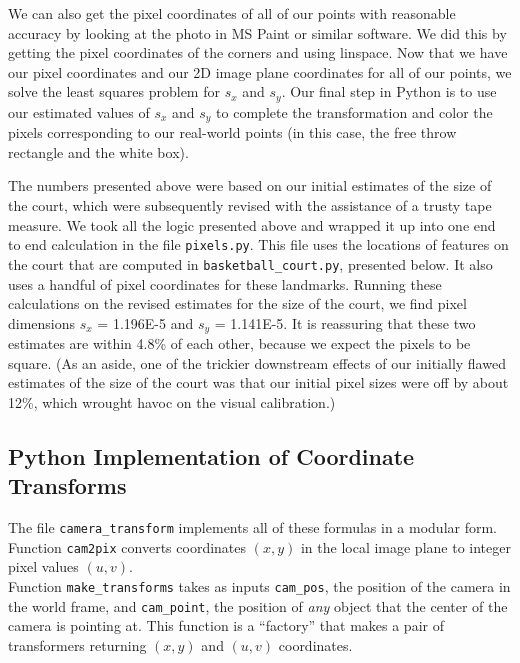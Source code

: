 \documentclass{article}
\begin{document}
We can also get the pixel coordinates of all of our points with reasonable accuracy by looking at the photo in MS Paint or similar software. 
We did this by getting the pixel coordinates of the corners and using linspace. 
Now that we have our pixel coordinates and our 2D image plane coordinates for all of our points, we solve the least squares problem for $s_x$ and $s_y$. 
Our final step in Python is to use our estimated values of $s_x$ and $s_y$ to complete the transformation and color the pixels corresponding to our real-world points 
(in this case, the free throw rectangle and the white box).

The numbers presented above were based on our initial estimates of the size of the court, 
which were subsequently revised with the assistance of a trusty tape measure.
We took all the logic presented above and wrapped it up into one end to end calculation
in the file \texttt{pixels.py}.  This file uses the locations of features on the court that are computed
in \texttt{basketball\_court.py}, presented below.  
It also uses a handful of pixel coordinates for these landmarks.
Running these calculations on the revised estimates for the size of the court,
we find pixel dimensions $s_x$ = 1.196E-5 and $s_y$ = 1.141E-5.
It is reassuring that these two estimates are within 4.8\% of each other, because we expect the pixels to be square.
(As an aside, one of the trickier downstream effects of our initially flawed estimates of the size of the court
was that our initial pixel sizes were off by about 12\%, which wrought havoc on the visual calibration.)

\subsection{Python Implementation of Coordinate Transforms}
The file \texttt{camera\_transform} implements all of these formulas in a modular form. \\
Function \texttt{cam2pix} converts coordinates $(x, y)$ in the local image plane to integer pixel values $(u, v)$. \\
Function \texttt{make\_transforms} takes as inputs 
\texttt{cam\_pos}, the position of the camera in the world frame, and
\texttt{cam\_point}, the position of \textit{any} object that the center of the camera is pointing at.
This function is a ``factory'' that makes a pair of transformers returning $(x, y)$ and $(u, v)$ coordinates.

\bigskip
\end{document}
